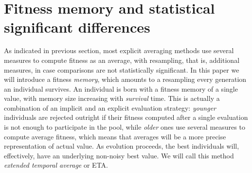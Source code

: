 \documentclass{llncs}
\begin{document}
\section{Fitness memory and statistical significant differences}
\label{sec:wilcoxon}

As indicated in previous section, most explicit averaging methods
use several measures to compute fitness as an average, with
resampling, that is, additional measures, in case 
comparisons are not
statistically significant. In this paper we will introduce a fitness
{\em memory}, which amounts 
to a resampling every generation an
individual survives. An individual is born with a fitness
memory of a single value, with memory size increasing with {\em
  survival} time. This is actually a combination of an implicit and an 
explicit evaluation strategy: {\em younger} individuals are rejected
outright if their fitness computed after a single evaluation is not
enough to participate in the pool, while  {\em older} ones use several
measures to compute average fitness, which means that averages will be
a more precise representation of actual value. 
As evolution proceeds,
the best individuals will, effectively, have an underlying non-noisy
best value. We will call this method {\em extended temporal average}
or {\sf ETA}. 
\end{document}
